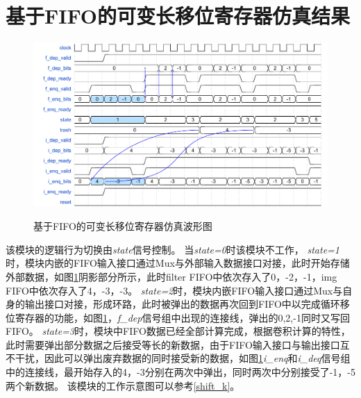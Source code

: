 \section{基于FIFO的可变长移位寄存器仿真结果}
\begin{figure}[h]
    \centering
    \includegraphics[scale=0.7]{../pdf/shift_w.pdf}\\
    \caption{基于FIFO的可变长移位寄存器仿真波形图}
    \label{shift_w}
\end{figure}
该模块的逻辑行为切换由\emph{state}信号控制。
当\emph{state=0}时该模块不工作，
\emph{state=1}时，模块内嵌的FIFO输入接口通过Mux与外部输入数据接口对接，此时开始存储外部数据，如图\ref{shift_w}阴影部分所示，此时filter FIFO中依次存入了0，-2，-1，img FIFO中依次存入了4，-3，-3。
\emph{state=2}时，模块内嵌FIFO输入接口通过Mux与自身的输出接口对接，形成环路，此时被弹出的数据再次回到FIFO中以完成循环移位寄存器的功能，如图\ref{shift_w}，\emph{f\_dep}信号组中出现的连接线，弹出的0,2,-1同时又写回FIFO。
\emph{state=3}时，模块中FIFO数据已经全部计算完成，根据卷积计算的特性，此时需要弹出部分数据之后接受等长的新数据，由于FIFO输入接口与输出接口互不干扰，因此可以弹出废弃数据的同时接受新的数据，如图\ref{shift_w}\emph{i\_enq}和\emph{i\_deq}信号组中的连接线，最开始存入的4，-3分别在两次中弹出，同时两次中分别接受了-1，-5两个新数据。
该模块的工作示意图可以参考\ref{shift_k}。

